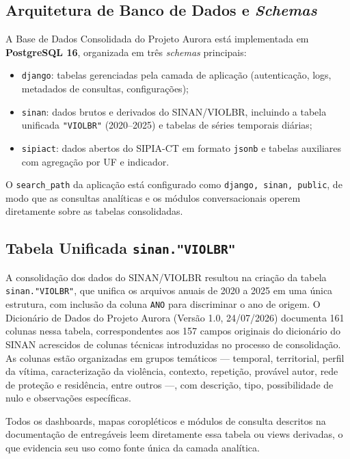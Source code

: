 \documentclass[11pt,a4paper]{article}
\begin{document}
\subsection{Arquitetura de Banco de Dados e \emph{Schemas}}
\label{subsec:schemas}

A Base de Dados Consolidada do Projeto Aurora está implementada em \textbf{PostgreSQL 16}, organizada em três \emph{schemas} principais:

\begin{itemize}
  \item \texttt{django}: tabelas gerenciadas pela camada de aplicação (autenticação, logs, metadados de consultas, configurações);
  \item \texttt{sinan}: dados brutos e derivados do SINAN/VIOLBR, incluindo a tabela unificada \texttt{"VIOLBR"} (2020–2025) e tabelas de séries temporais diárias;
  \item \texttt{sipiact}: dados abertos do SIPIA-CT em formato \texttt{jsonb} e tabelas auxiliares com agregação por UF e indicador.
\end{itemize}

O \texttt{search\_path} da aplicação está configurado como \texttt{django, sinan, public}, de modo que as consultas analíticas e os módulos conversacionais operem diretamente sobre as tabelas consolidadas.

\subsection{Tabela Unificada \texttt{sinan."VIOLBR"}}
\label{subsec:violbr_tabela}

A consolidação dos dados do SINAN/VIOLBR resultou na criação da tabela \texttt{sinan."VIOLBR"}, que unifica os arquivos anuais de 2020 a 2025 em uma única estrutura, com inclusão da coluna \texttt{ANO} para discriminar o ano de origem. O Dicionário de Dados do Projeto Aurora (Versão 1.0, 24/07/2026) documenta 161 colunas nessa tabela, correspondentes aos 157 campos originais do dicionário do SINAN acrescidos de colunas técnicas introduzidas no processo de consolidação. As colunas estão organizadas em grupos temáticos — temporal, territorial, perfil da vítima, caracterização da violência, contexto, repetição, provável autor, rede de proteção e residência, entre outros —, com descrição, tipo, possibilidade de nulo e observações específicas.

Todos os dashboards, mapas coropléticos e módulos de consulta descritos na documentação de entregáveis leem diretamente essa tabela ou views derivadas, o que evidencia seu uso como fonte única da camada analítica.
\end{document}
